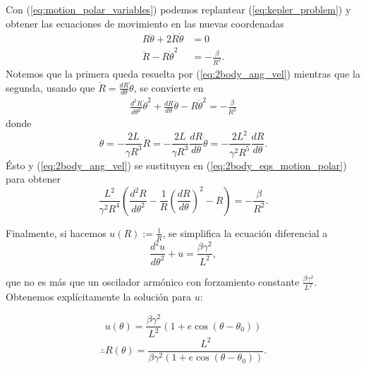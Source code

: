 Con (\ref{eq:motion_polar_variables}) podemos replantear (\ref{eq:kepler_problem}) y obtener las ecuaciones de movimiento en las nuevas coordenadas
\begin{align}
 R \ddot{\theta} + 2 \dot{R} \dot{\theta} &= 0 \\
 \ddot{R} - R \dot{\theta}^2 &= -\frac{\beta}{R^2}.
 \label{eq:2body_eqs_motion_polar}
\end{align}
Notemos que la primera queda resuelta por (\ref{eq:2body_ang_vel}) mientras que la segunda, usando que $\dot{R} = \frac{d R}{d\theta} \dot{\theta}$, se convierte en
\begin{align*}
 \frac{d^2 R}{d \theta^2} \dot{\theta}^2 + \frac{dR}{d\theta} \ddot{\theta} - R \dot{\theta}^2 = - \frac{\beta}{R^2}
\end{align*}
donde 
\begin{equation*}
 \ddot{\theta} = -\frac{2L}{\gamma R^3}\dot{R} = -\frac{2L}{\gamma R^3} \frac{dR}{d\theta}\dot{\theta} = - \frac{2L^2}{\gamma^2 R^5} \frac{dR}{d\theta}.
\end{equation*}
Ésto y (\ref{eq:2body_ang_vel}) se sustituyen en  (\ref{eq:2body_eqs_motion_polar}) para obtener
\begin{equation*}
 \frac{L^2}{\gamma^2 R^4}\left( \frac{d^2R}{d\theta^2} - \frac{1}{R} \left(\frac{dR}{d\theta} \right)^2 -R \right) = - \frac{\beta}{R^2}.
\end{equation*}

Finalmente, si hacemos $u(R) := \frac{1}{R}$, se simplifica la ecuación diferencial a
\begin{equation}
 \frac{d^2u}{d\theta^2} + u = \frac{\beta \gamma^2}{L^2},
\end{equation}

que no es más que un oscilador armónico con forzamiento constante $\frac{\beta \gamma^2}{L^2}$. Obtenemos explícitamente la solución para $u$:

\begin{equation*}
 u(\theta) = \frac{\beta \gamma^2}{L^2} \left( 1 + e \cos (\theta - \theta_0 ) \right) 
\end{equation*}
\begin{equation}
 \therefore R(\theta) = \frac{L^2}{\beta \gamma^2 \left(1 + e \cos (\theta - \theta_0) \right)}.
 \label{eq:2body_solution}
\end{equation}


